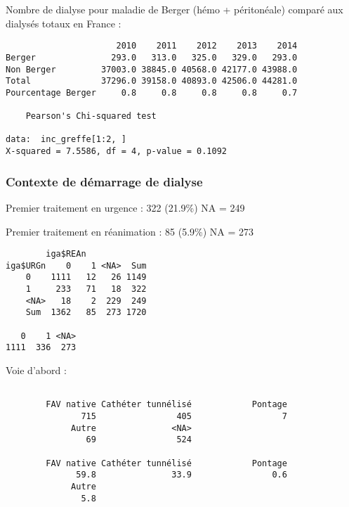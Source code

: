 \documentclass[11pt,a4paper]{article}\usepackage[]{graphicx}\usepackage[]{color}
\makeatletter
\newenvironment{kframe}{%
 \def\at@end@of@kframe{}%
 \ifinner\ifhmode%
  \def\at@end@of@kframe{\end{minipage}}%
  \begin{minipage}{\columnwidth}%
 \fi\fi%
 \def\FrameCommand##1{\hskip\@totalleftmargin \hskip-\fboxsep
 \colorbox{shadecolor}{##1}\hskip-\fboxsep
     \hskip-\linewidth \hskip-\@totalleftmargin \hskip\columnwidth}%
 \MakeFramed {\advance\hsize-\width
   \@totalleftmargin\z@ \linewidth\hsize
   \@setminipage}}%
 {\par\unskip\endMakeFramed%
 \at@end@of@kframe}
\newenvironment{knitrout}{}{} %
\makeatother
\begin{document}
Nombre de dialyse pour maladie de Berger (hémo + péritonéale) comparé aux dialysés totaux en France :

\begin{knitrout}
\color{fgcolor}\begin{kframe}
\begin{verbatim}
                      2010    2011    2012    2013    2014
Berger               293.0   313.0   325.0   329.0   293.0
Non Berger         37003.0 38845.0 40568.0 42177.0 43988.0
Total              37296.0 39158.0 40893.0 42506.0 44281.0
Pourcentage Berger     0.8     0.8     0.8     0.8     0.7

	Pearson's Chi-squared test

data:  inc_greffe[1:2, ]
X-squared = 7.5586, df = 4, p-value = 0.1092
\end{verbatim}
\end{kframe}
\end{knitrout}

    \subsubsection{Contexte de démarrage de dialyse}
    
Premier traitement en urgence :  322 (21.9\%) NA = 249

Premier traitement en réanimation :  85 (5.9\%) NA = 273

\begin{knitrout}
\color{fgcolor}\begin{kframe}
\begin{verbatim}
        iga$REAn
iga$URGn    0    1 <NA>  Sum
    0    1111   12   26 1149
    1     233   71   18  322
    <NA>   18    2  229  249
    Sum  1362   85  273 1720

   0    1 <NA> 
1111  336  273 
\end{verbatim}
\end{kframe}
\end{knitrout}

Voie d’abord :
\begin{knitrout}
\color{fgcolor}\begin{kframe}
\begin{verbatim}

        FAV native Cathéter tunnélisé            Pontage 
               715                405                  7 
             Autre               <NA> 
                69                524 

        FAV native Cathéter tunnélisé            Pontage 
              59.8               33.9                0.6 
             Autre 
               5.8 
\end{verbatim}
\end{kframe}
\end{knitrout}
\end{document}
